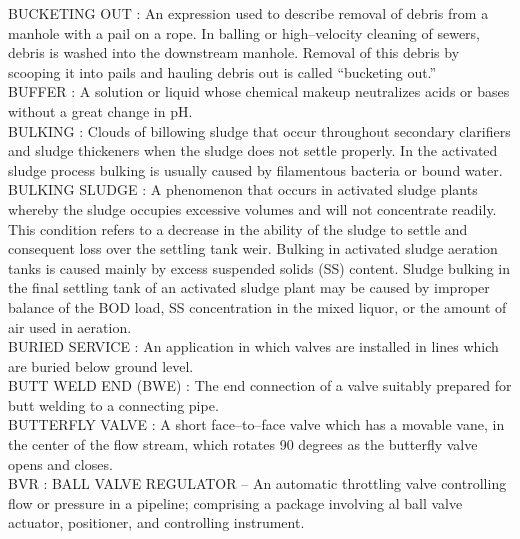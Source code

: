 \vspace{0.15cm}
BUCKETING OUT :  An expression used to describe removal of debris from a manhole with a pail on a rope. In balling or high–velocity cleaning of sewers, debris is washed into the downstream manhole. Removal of this debris by scooping it into pails and hauling debris out is called “bucketing out.” \\
\vspace{0.15cm}
BUFFER :  A solution or liquid whose chemical makeup neutralizes acids or bases without a great change in pH.\\
\vspace{0.15cm}
BULKING :  Clouds of billowing sludge that occur throughout secondary clarifiers and sludge thickeners when the sludge does not settle properly.   In the activated sludge process bulking is usually caused by filamentous bacteria or bound water.\\
\vspace{0.15cm}
BULKING SLUDGE :   A phenomenon that occurs in activated sludge plants whereby the sludge occupies excessive volumes and will not concentrate readily. This condition refers to a decrease in the ability of the sludge to settle and consequent loss over the settling tank weir. Bulking in activated sludge aeration tanks is caused mainly by excess suspended solids (SS) content. Sludge bulking in the final settling tank of an activated sludge plant may be caused by improper balance of the BOD load, SS concentration in the mixed liquor, or the amount of air used in aeration.\\
\vspace{0.15cm}
BURIED SERVICE :   An application in which valves are installed in lines which are buried below ground level.\\
\vspace{0.15cm}
BUTT WELD END (BWE) :   The end connection of a valve suitably prepared for butt welding to a connecting pipe.\\
\vspace{0.15cm}
BUTTERFLY VALVE :   A short face–to–face valve which has a movable vane, in the center of the flow stream, which rotates 90 degrees as the butterfly valve opens and closes.\\
\vspace{0.15cm}
BVR :  BALL VALVE REGULATOR –  An automatic throttling valve controlling flow or pressure in a pipeline; comprising a package involving al ball valve actuator, positioner, and controlling instrument.\\
